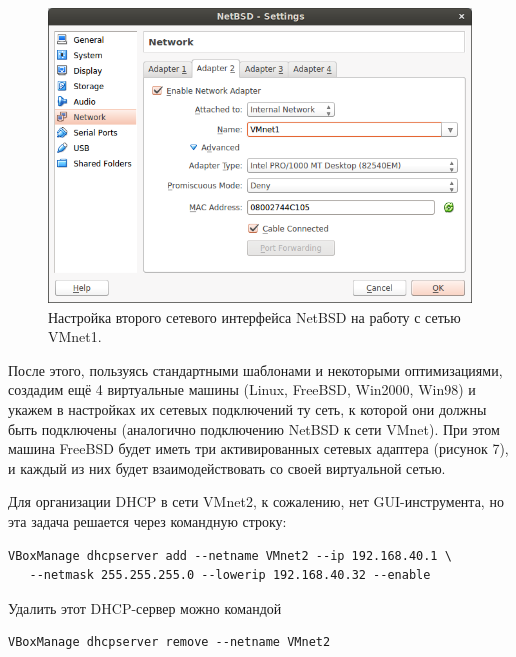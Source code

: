 \begin{figure}[h!]
\centering
\includegraphics[scale=0.6]{res/netbsd-vmnet1}
\caption{Настройка второго сетевого интерфейса NetBSD на работу с сетью VMnet1.}
\end{figure}

После этого, пользуясь стандартными шаблонами и некоторыми оптимизациями, создадим ещё 4 виртуальные машины (Linux, FreeBSD, Win2000, Win98) и укажем в настройках их сетевых подключений ту сеть, к которой они должны быть подключены (аналогично подключению NetBSD к сети VMnet). При этом машина FreeBSD будет иметь три активированных сетевых адаптера (рисунок 7), и каждый из них будет взаимодействовать со своей виртуальной сетью.

Для организации DHCP в сети VMnet2, к сожалению, нет GUI-инструмента, но эта задача решается через командную строку:

\begin{Verbatim}[frame=single]
VBoxManage dhcpserver add --netname VMnet2 --ip 192.168.40.1 \
   --netmask 255.255.255.0 --lowerip 192.168.40.32 --enable
\end{Verbatim}

Удалить этот DHCP-сервер можно командой

\begin{Verbatim}[frame=single]
VBoxManage dhcpserver remove --netname VMnet2
\end{Verbatim}

